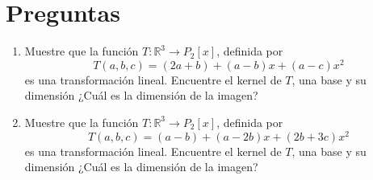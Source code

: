 \documentclass[a4paper]{article}
\begin{document}
\thispagestyle{empty}
\section*{Preguntas}
\begin{enumerate}


     \item Muestre que la funci\'on 
      $T:\mathbb{R}^3\to P_2[x]$, definida por $$T(a,b,c)=(2a+b)+(a-b)x+ (a-c)x^2$$
     es una transformaci\'on lineal. Encuentre el kernel de $T$, una base y su dimensi\'on ¿Cu\'al es la dimensi\'on de la imagen?
     
    


        
     \item Muestre que la funci\'on 
          $T:\mathbb{R}^3\to P_2[x]$, definida por $$T(a,b,c)=(a-b)+(a-2b)x+ (2b+3c)x^2$$
          es una transformaci\'on lineal. Encuentre el kernel de $T$, una base y su dimensi\'on ¿Cu\'al es la dimensi\'on de la imagen?







\end{enumerate}
\end{document}
